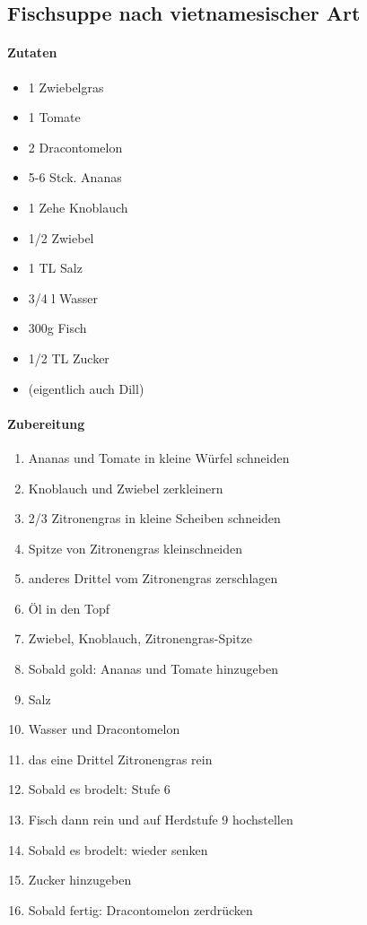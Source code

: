 \newpage
\subsection{Fischsuppe nach vietnamesischer Art}
\paragraph{Zutaten}
\begin{itemize}[noitemsep]
	\item 1 Zwiebelgras
	\item 1 Tomate 
	\item 2 Dracontomelon
	\item 5-6 Stck. Ananas
	\item 1 Zehe Knoblauch
	\item 1/2 Zwiebel
	\item 1 TL Salz
	\item 3/4 l Wasser 
	\item 300g Fisch
	\item 1/2 TL Zucker
	\item (eigentlich auch Dill)
\end{itemize}
\paragraph{Zubereitung}
\begin{enumerate}[noitemsep]
	\item Ananas und Tomate in kleine Würfel schneiden
	\item Knoblauch und Zwiebel zerkleinern
	\item 2/3 Zitronengras in kleine Scheiben schneiden
	\item Spitze von Zitronengras kleinschneiden
	\item anderes Drittel vom Zitronengras zerschlagen
	\item Öl in den Topf
	\item Zwiebel, Knoblauch, Zitronengras-Spitze 
	\item Sobald gold: Ananas und Tomate hinzugeben
	\item Salz 
	\item Wasser und Dracontomelon
	\item das eine Drittel Zitronengras rein
	\item Sobald es brodelt: Stufe 6
	\item Fisch dann rein und auf Herdstufe 9 hochstellen
	\item Sobald es brodelt: wieder senken
	\item Zucker hinzugeben
	\item Sobald fertig: Dracontomelon zerdrücken
\end{enumerate}
